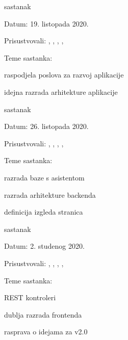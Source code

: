 \begin{packed_enum}
			\item  sastanak
			\item[] \begin{packed_item}
				\item Datum: 19. listopada 2020.
				\item Prisustvovali: \fuc, \hab, \hre, \juk, \pav
				\item Teme sastanka:
				\begin{packed_item}
					\item  raspodjela poslova za razvoj aplikacije
					\item  idejna razrada arhitekture aplikacije
				\end{packed_item}
			\end{packed_item}
		
			\item  sastanak
			\item[] \begin{packed_item}
				\item Datum: 26. listopada 2020.
				\item Prisustvovali: \djo, \fuc, \hab, \hre, \juk
				\item Teme sastanka:
				\begin{packed_item}
					\item  razrada baze s asistentom
					\item  razrada arhitekture backenda
					\item  definicija izgleda stranica
				\end{packed_item}
			\end{packed_item}
			
			\item  sastanak
			\item[] \begin{packed_item}
				\item Datum: 2. studenog 2020.
				\item Prisustvovali: \fuc, \hab, \hre, \juk, \pav
				\item Teme sastanka:
				\begin{packed_item}
					\item  REST kontroleri
					\item  dublja razrada frontenda
					\item  rasprava o idejama za v2.0
				\end{packed_item}
			\end{packed_item}
		

\end{packed_enum}
